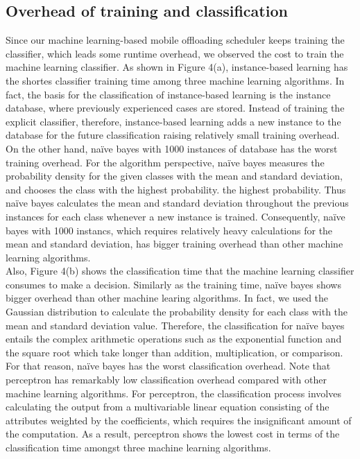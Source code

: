 \documentclass[10pt, conference, compsocconf]{IEEEtran}
\begin{document}
{\subsection{Overhead of training and classification}
%
Since our machine learning-based mobile offloading scheduler keeps
training the classifier, which leads some runtime overhead, we
observed the cost to train the machine learning classifier.
%
As shown in Figure 4(a), instance-based learning has the shortes
classifier training time among three machine learning algorithms.  
%
In fact, the basis for the classification of instance-based learning is
the instance database, where previously experienced cases are stored.
%
Instead of training the explicit classifier, therefore, instance-based
learning adds a new instance to the database for the future
classification raising relatively small training overhead.
%
On the other hand, na\"{i}ve bayes with 1000 instances of database has
the worst training overhead. 
%
For the algorithm perspective, na\"{i}ve bayes measures the
probability density for the given classes with the mean and standard
deviation, and chooses the class with the highest probability.
the highest probability.
%
Thus na\"{i}ve bayes calculates the mean and standard deviation
throughout the previous instances for each class whenever a new instance
is trained.
%
Consequently, na\"{i}ve bayes with 1000 instancs, which requires
relatively heavy calculations for the mean and standard deviation, has
bigger training overhead than other machine learning algorithms.\\
%
\indent Also, Figure 4(b) shows the classification time that the machine
learning classifier consumes to make a decision.
%
Similarly as the training time, na\"{i}ve bayes shows bigger overhead
than other machine learing algorithms.
%
In fact, we used the Gaussian distribution to calculate the probability
density for each class with the mean and standard deviation value.
%
Therefore, the classification for na\"{i}ve bayes entails the complex
arithmetic operations such as the exponential function and the square root
which take longer than addition, multiplication, or comparison.
%
For that reason, na\"{i}ve bayes has the worst classification overhead.
%
Note that perceptron has remarkably low classification overhead compared
with other machine learning algorithms. 
%
For perceptron, the classification process involves calculating the
output from a multivariable linear equation consisting of the attributes
weighted by the coefficients, which requires the insignificant amount of
the computation. 
%
As a result, perceptron shows the lowest cost in terms of the
classification time amongst three machine learning algorithms.
%
}
\end{document}
